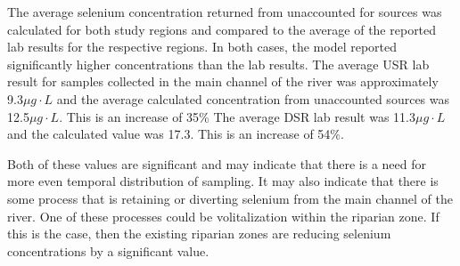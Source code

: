 \begin{linenumbers}[1]
The average selenium concentration returned from unaccounted for sources was calculated for both study regions and compared to the average of the reported lab results for the respective regions.  In both cases, the model reported significantly higher concentrations than the lab results.  The average USR lab result for samples collected in the main channel of the river was approximately 9.3$\mu g \cdot L$ and the average calculated concentration from unaccounted sources was 12.5$\mu g \cdot L$.  This is an increase of 35\%  The average DSR lab result was 11.3$\mu g \cdot L$ and the calculated value was 17.3.  This is an increase of 54\%.

Both of these values are significant and may indicate that there is a need for more even temporal distribution of sampling.  It may also indicate that there is some process that is retaining or diverting selenium from the main channel of the river.  One of these processes could be volitalization within the riparian zone.  If this is the case, then the existing riparian zones are reducing selenium concentrations by a significant value.
\end{linenumbers}